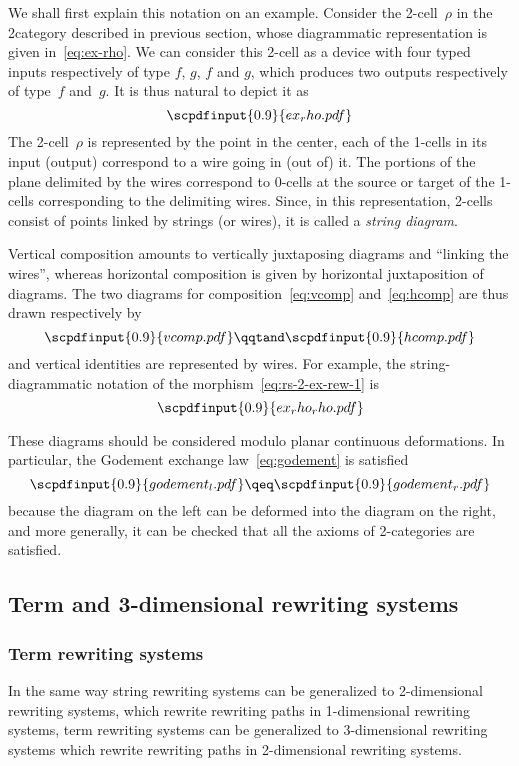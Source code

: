 \documentclass{LMCS}
\newcommand{\strid}[1]{\scpdfinput{0.9}{#1.pdf}}
\begin{document}
We shall first explain this notation on an example. Consider the 2-cell~$\rho$
in the 2\nbd{}category described in previous section, whose diagrammatic
representation is given in~\eqref{eq:ex-rho}. We can consider this 2-cell as a
device with four typed inputs respectively of type $f$, $g$, $f$ and $g$, which
produces two outputs respectively of type~$f$ and~$g$. It is thus natural to
depict it as
\[
\strid{ex_rho}
\]
The 2-cell~$\rho$ is represented by the point in the center, each of the 1-cells
in its input (\resp output) correspond to a wire going in (\resp out of) it. The
portions of the plane delimited by the wires correspond to 0-cells at the source
or target of the 1-cells corresponding to the delimiting wires. Since, in this
representation, 2-cells consist of points linked by strings (or wires), it is
called a \emph{string diagram}.



Vertical composition amounts to vertically juxtaposing diagrams and ``linking
the wires'', whereas horizontal composition is given by horizontal juxtaposition
of diagrams. The two diagrams for composition~\eqref{eq:vcomp}
and~\eqref{eq:hcomp} are thus drawn respectively by
\[
\strid{vcomp}
\qqtand
\strid{hcomp}
\]
and vertical identities are represented by wires. For example, the
string-diagrammatic notation of the morphism~\eqref{eq:rs-2-ex-rew-1} is
\[
\strid{ex_rho_rho}
\]

These diagrams should be considered modulo planar continuous deformations. In
particular, the Godement exchange law~\eqref{eq:godement} is satisfied
\[
\strid{godement_l}
\qeq
\strid{godement_r}
\]
because the diagram on the left can be deformed into the diagram on the right,
and more generally, it can be checked that all the axioms of 2-categories are
satisfied.


\subsection{Term and 3-dimensional rewriting systems}
\subsubsection{Term rewriting systems}
\label{sec:trs}
In the same way string rewriting systems can be generalized to 2-dimensional
rewriting systems, which rewrite rewriting paths in 1-dimensional rewriting
systems, term rewriting systems can be generalized to 3-dimensional rewriting
systems which rewrite rewriting paths in 2-dimensional rewriting systems.
\end{document}

